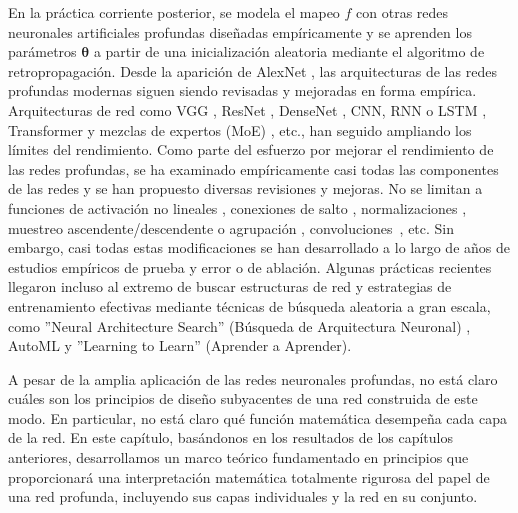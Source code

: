 \documentclass[../../book-main.tex]{subfiles}
\begin{document}
En la práctica corriente posterior, se modela el mapeo $f$ con otras
redes neuronales artificiales profundas diseñadas empíricamente y se aprenden los
parámetros $\bm \theta$ a partir de una inicialización aleatoria mediante el algoritmo 
de retropropagación. Desde
la aparición de AlexNet \cite{krizhevsky2012imagenet}, las arquitecturas de
las redes profundas modernas siguen siendo revisadas y mejoradas en forma empírica.
Arquitecturas de red como VGG \cite{simonyan2014very}, ResNet
\cite{he2016deep}, DenseNet \cite{dense-net}, CNN, RNN o LSTM
\cite{LSTM}, Transformer \cite{vaswani2017attention} y mezclas
de expertos (MoE) \cite{MoE,Fedus-2022}, etc., han seguido ampliando
los límites del rendimiento. Como parte del esfuerzo por mejorar el
rendimiento de las redes profundas, se ha examinado empíricamente casi todas las componentes de las redes
y se han propuesto diversas revisiones y mejoras. No se limitan a funciones de activación no lineales
\cite{maas2013rectifier,klambauer2017self,xu2015empirical,nwankpa2018activation},
conexiones de salto \cite{ronneberger2015u,he2016deep}, normalizaciones
\cite{ioffe2015batch,ba2016layer,ulyanov2016instance,wu2018group,miyato2018spectral},
muestreo ascendente/descendente o agrupación \cite{scherer2010evaluation},
convoluciones~\cite{lecun1998gradient,krizhevsky2012imagenet}, etc. Sin embargo, casi 
todas estas modificaciones se han desarrollado a lo largo de
años de estudios empíricos {de prueba y error} o de ablación. Algunas prácticas recientes
llegaron incluso al extremo de buscar estructuras de red
y estrategias de entrenamiento efectivas mediante técnicas de búsqueda aleatoria
a gran escala, como ''Neural Architecture Search'' (Búsqueda de Arquitectura Neuronal)
\cite{NAS-1,Baker2017DesigningNN}, AutoML \cite{automl} y ''Learning to Learn'' (Aprender a
Aprender)\cite{andrychowicz2016learning}.

A pesar de la amplia aplicación de las redes neuronales profundas, no está claro
cuáles son los principios de diseño subyacentes de una red construida de este modo.
En particular, no está claro qué función matemática desempeña cada
capa de la red. En este capítulo, basándonos en los resultados
de los capítulos anteriores, desarrollamos un marco teórico fundamentado en principios que
proporcionará una interpretación matemática totalmente rigurosa del papel de una
red profunda, incluyendo sus capas individuales y la red en su conjunto.
\end{document}
